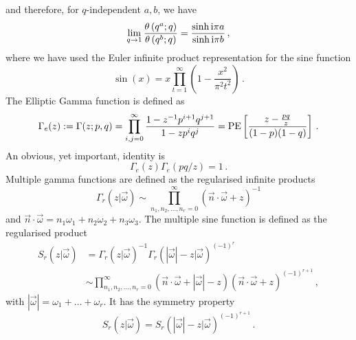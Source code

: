 \documentclass[main.tex]{subfiles}
\begin{document}
and therefore, for $q$-independent $a,b$, we have
\begin{equation}\label{eqn:thetafunctionlimit}
\lim_{q\to1}\frac{\theta\left(q^a;q\right)}{\theta\left(q^b;q\right)}=\frac{\sinh\mathrm{i}\pi a}{\sinh\mathrm{i}\pi b}\,,
\end{equation}
where we have used the Euler infinite product representation for the sine function
\begin{equation}\label{eqn:Eulersine}
\sin(x)=x\prod_{t=1}^{\infty}\left(1-\frac{x^2}{\pi^2t^2}\right)\,.
\end{equation}
The Elliptic Gamma function is defined as
\begin{equation}
\label{eqn:EllGamma}
\Gamma_e(z):=\Gamma(z;p,q)=\prod_{i,j=0}^{\infty}\frac{1-z^{-1}p^{i+1}q^{j+1}}{1-zp^iq^j}=\operatorname{\mathrm{PE}}\left[\frac{z-\frac{pq}{z}}{(1-p)(1-q)}\right]\,.
\end{equation}
An obvious, yet important, identity is 
\begin{equation}\label{eqn:gammaid}
\Gamma_e(z)\Gamma_e(pq/z)=1\,.
\end{equation}
Multiple gamma functions are defined as the regularised infinite products
\begin{equation}\label{eqn:multigamma}
\Gamma_r(z|\vec{\omega})\sim\prod_{n_1,n_2,\dots,n_r=0}^{\infty}(\vec{n}\cdot\vec{\omega}+z)^{-1}
\end{equation}
and $\vec{n}\cdot\vec{\omega}=n_1\omega_1+n_2\omega_2+n_3\omega_3$.
The multiple sine function is defined as the regularised product
\begin{equation}\label{eqn:multisine}
\begin{aligned}
S_r(z|\vec{\omega})&=\Gamma_r(z|\vec{\omega})^{-1}\Gamma_r(|\vec{\omega}|-z|\vec{\omega})^{(-1)^r}\\
&\sim \prod_{n_1,n_2,\dots,n_r=0}^{\infty}\left(\vec{n}\cdot\vec{\omega}+|\vec{\omega}|-z\right)\left(\vec{n}\cdot\vec{\omega}+z\right)^{(-1)^{r+1}}\,,
\end{aligned}
\end{equation} 
with $|\vec{\omega}|=\omega_1+\dots+\omega_r$. It has the symmetry property
\begin{equation}
S_r(z|\vec{\omega})=S_r(|\vec{\omega}|-z|\vec{\omega})^{(-1)^{r+1}}\,.
\end{equation}
\end{document}
